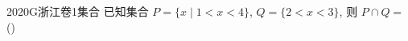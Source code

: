 
\begin{problem}{2020}{G}{浙江卷}{1}{集合}
已知集合 $ P=\{x\mid 1<x<4\} $, $ Q=\{2<x<3\} $, 则 $ P\cap Q= $ (\hspace{1cm})

\begin{choices}
\end{choices}
\end{problem}

\begin{answer}

\end{answer}

\begin{solutions}

\end{solutions}